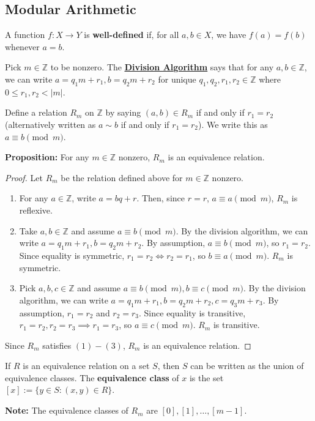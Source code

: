 \documentclass [12pt] {article}
\newcommand{\Z}{\mathbb{Z}}
\newenvironment{definition}[1]{\begin{tcolorbox}[title={Definition: #1},colback=green!5!white,colframe=black!75!green]}{\end{tcolorbox}}
\renewcommand{\href}[2]{\hyperref[#1]{\bf{\underline{{#2}}}}}
\renewcommand{\bf}[1]{\textbf{{#1}}}
\begin{document}
\newpage
\subsection{Modular Arithmetic}
\begin{definition}{Well-Defined Functions}
    A function $f : X \to Y$ is \bf{well-defined} if, for all $a, b \in X$, we have $f(a) = f(b)$
    whenever $a = b$.
\end{definition}

Pick $m \in \Z$ to be nonzero. The \href{thm:divalgo}{Division Algorithm} says that for any $a, b
\in \Z$, we can write $a = q_1 m + r_1, b = q_2 m + r_2$ for unique $q_1, q_2, r_1, r_2 \in \Z$
where $0 \leq r_1, r_2 < |m|$.
\begin{definition}{Modulo}
    Define a relation $R_m$ on $\Z$ by saying $(a, b) \in R_m$ if and only if $r_1 = r_2$
    (alternatively written as $a \sim b$ if and only if $r_1 = r_2$). We write this as
    $a \equiv b \pmod{m}$. 
\end{definition}
\bf{Proposition:} For any $m \in \Z$ nonzero, $R_m$ is an equivalence relation.
\begin{proof}
    Let $R_m$ be the relation defined above for $m \in \Z$ nonzero.
    \begin{enumerate}[label=(\arabic*)]
        \item For any $a \in \Z$, write $a = bq + r$. Then, since $r = r$, $a \equiv a
            \pmod{m}$, $R_m$ is reflexive.
        \item Take $a, b \in \Z$ and assume $a \equiv b \pmod{m}$. By the division algorithm,
            we can write $a = q_1 m + r_1, b = q_2 m + r_2$. By assumption, $a \equiv b \pmod{m}$, 
            so $r_1 = r_2$. Since equality is symmetric, $r_1 = r_2 \iff r_2 = r_1$, so
            $b \equiv a \pmod{m}$. $R_m$ is symmetric.
        \item Pick $a, b, c \in \Z$ and assume $a \equiv b \pmod{m}, b \equiv c \pmod{m}$.
            By the division algorithm, we can write 
            $a = q_1 m + r_1, b = q_2 m + r_2, c = q_3 m + r_3$. By assumption, $r_1 = r_2$ and
            $r_2 = r_3$. Since equality is transitive, $r_1 = r_2, r_2 = r_3 \implies r_1 = r_3$,
            so $a \equiv c \pmod{m}$. $R_m$ is transitive.
    \end{enumerate}
    Since $R_m$ satisfies $(1)-(3)$, $R_m$ is an equivalence relation.
\end{proof}
\begin{definition}{Equivalence Class}
    If $R$ is an equivalence relation on a set $S$, then $S$ can be written as the union of
    equivalence classes. The \bf{equivalence class} of $x$ is the set 
    $[x] := \{ y \in S : (x, y) \in R \}$.
\end{definition}
\bf{Note:} The equivalence classes of $R_m$ are $[0], [1], \ldots, [m - 1]$.
\end{document}
